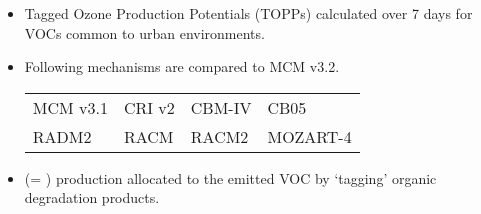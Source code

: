 \begin{BlueBox}
    \vskip-1cm
    \begin{block}{}
        \begin{itemize} 
            \item Tagged Ozone Production Potentials (TOPPs) \citep{Butler:2011} calculated over 7 days for VOCs common to urban environments. \vspace{5mm}
            \item Following mechanisms are compared to MCM v3.2.
                {
                     \normalsize
                    \begin{table}[htp]
                        \begin{center}
                            \begin{tabular}{P{7cm}P{7cm}P{7cm}P{7cm}}
                                MCM v3.1 & CRI v2 & CBM-IV & CB05 \\
                                RADM2 & RACM & RACM2 & MOZART-4 
                            \end{tabular}
                        \end{center}
                    \end{table}
                } \vspace{5mm}
            \item {} (= ) production allocated to the emitted VOC by `tagging' organic degradation products. \vspace{4mm}
        \end{itemize}
    \end{block}
\end{BlueBox}
